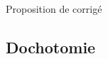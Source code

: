 
\vspace{0.1cm}
\begin{huge}
 Proposition de corrigé
\end{huge}

\subsection{Dochotomie}
\setcounter{thequestion}{0}
